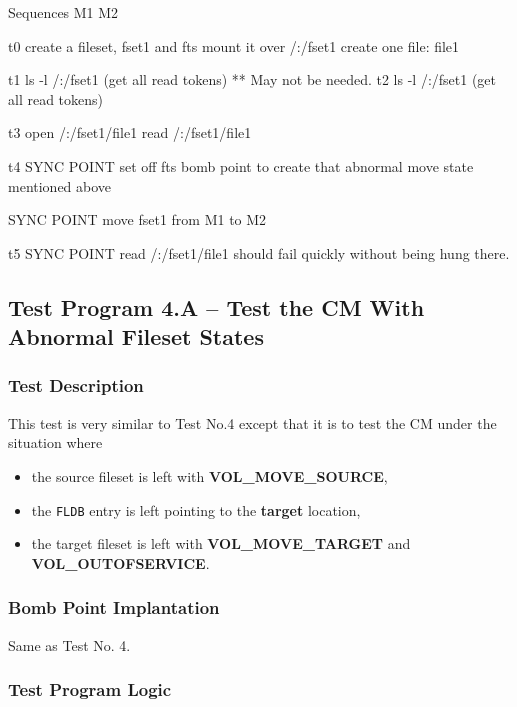 \begin{programexample}

Sequences	M1					M2

t0		create a fileset, fset1 and fts mount it over /:/fset1
		create one file: file1
            
t1							ls -l /:/fset1
							(get all read tokens)
							** May not be needed. 
t2		ls -l /:/fset1
		(get all read tokens)
		

t3		open /:/fset1/file1
		read /:/fset1/file1

t4		SYNC POINT	
		set off fts bomb point to create 
		that abnormal move state mentioned above

		SYNC POINT
		move fset1 from M1 to M2


t5		SYNC POINT
		read /:/fset1/file1 
		should fail quickly without being
		hung there. 

\end{programexample}



\subsection {Test Program 4.A -- Test the CM With Abnormal Fileset States}

\subsubsection {Test Description}

This test is very similar to Test No.4 except that it is to test the CM 
under the situation where 
\begin{itemize}
\item the source fileset is left with {\bf VOL_MOVE_SOURCE}, 
\item the {\tt FLDB} entry is left pointing to the {\bf target} location,
\item the target fileset is left with {\bf VOL_MOVE_TARGET} and {\bf VOL_OUTOFSERVICE}.
\end{itemize}

\subsubsection {Bomb Point Implantation}

Same as Test No. 4.

\subsubsection {Test Program Logic}

